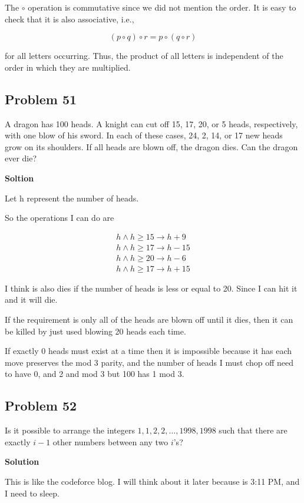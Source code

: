 \documentclass[12pt,tikz,border=10pt]{article}
\theoremstyle{definition}
\theoremstyle{remark}
\begin{document}
The \(\circ\) operation is commutative since we did not mention the order. It is easy to check that it is also associative, i.e.,

\[
(p \circ q) \circ r = p \circ (q \circ r)
\]

for all letters occurring. Thus, the product of all letters is independent of the order in which they are multiplied.

\subsection{Problem 51}
A dragon has 100 heads. A knight can cut off 15, 17, 20, or 5 heads, respectively,
with one blow of his sword. In each of these cases, 24, 2, 14, or 17 new heads grow
on its shoulders. If all heads are blown off, the dragon dies. Can the dragon ever die?

\textbf{Soltion}

Let h represent the number of heads.

So the operations I can do are

\begin{align*}
  h \wedge h\geq 15 \rightarrow h+9 \\
  h \wedge h\geq 17 \rightarrow h-15 \\
  h \wedge h \geq 20\rightarrow h-6 \\
  h \wedge h \geq 17 \rightarrow h+15 
\end{align*}

I think is also dies if the number of heads is less or equal to 20. Since I 
can hit it and it will die.

If the requirement is only all of the heads are blown off until it dies, then it can be killed by just used blowing 20 heads each time.

If exactly 0 heads must exist at a time then it is impossible because it has each move preserves the mod 3 parity, and the number of 
heads I must chop off need to have 0, and 2 and mod 3 but 100 has 1 mod 3.

\subsection{Problem 52}


Is it possible to arrange the integers \(1, 1, 2, 2, \dots, 1998, 1998\) such that there are exactly \(i - 1\) other numbers between any two \(i\)'s?

\textbf{Solution}

This is like the codeforce blog. I will think about it later because is 3:11 PM, and I need to sleep.
\end{document}
